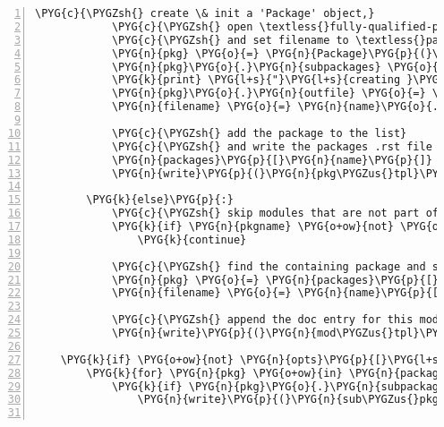 \begin{Verbatim}[commandchars=\\\{\},numbers=left,firstnumber=1,stepnumber=5]
            \PYG{c}{\PYGZsh{} create \& init a 'Package' object,}
            \PYG{c}{\PYGZsh{} open \textless{}fully-qualified-package-name\textgreater{}.rst}
            \PYG{c}{\PYGZsh{} and set filename to \textless{}package-name\textgreater{}/\PYGZus{}\PYGZus{}init\PYGZus{}\PYGZus{}.py}
            \PYG{n}{pkg} \PYG{o}{=} \PYG{n}{Package}\PYG{p}{(}\PYG{p}{)}
            \PYG{n}{pkg}\PYG{o}{.}\PYG{n}{subpackages} \PYG{o}{=} \PYG{p}{[}\PYG{p}{]}
            \PYG{k}{print} \PYG{l+s}{"}\PYG{l+s}{creating }\PYG{l+s+si}{\PYGZpc{}s}\PYG{l+s}{.rst}\PYG{l+s}{"} \PYG{o}{\PYGZpc{}} \PYG{n}{name}
            \PYG{n}{pkg}\PYG{o}{.}\PYG{n}{outfile} \PYG{o}{=} \PYG{n+nb}{open}\PYG{p}{(}\PYG{n}{name} \PYG{o}{+} \PYG{l+s}{'}\PYG{l+s}{.rst}\PYG{l+s}{'}\PYG{p}{,} \PYG{l+s}{'}\PYG{l+s}{w}\PYG{l+s}{'}\PYG{p}{)}
            \PYG{n}{filename} \PYG{o}{=} \PYG{n}{name}\PYG{o}{.}\PYG{n}{split}\PYG{p}{(}\PYG{l+s}{'}\PYG{l+s}{.}\PYG{l+s}{'}\PYG{p}{)}\PYG{p}{[}\PYG{o}{-}\PYG{l+m+mi}{1}\PYG{p}{]} \PYG{o}{+} \PYG{n}{os}\PYG{o}{.}\PYG{n}{sep} \PYG{o}{+} \PYG{l+s}{'}\PYG{l+s}{\PYGZus{}\PYGZus{}init\PYGZus{}\PYGZus{}.py}\PYG{l+s}{'}

            \PYG{c}{\PYGZsh{} add the package to the list}
            \PYG{c}{\PYGZsh{} and write the packages .rst file heading}
            \PYG{n}{packages}\PYG{p}{[}\PYG{n}{name}\PYG{p}{]} \PYG{o}{=} \PYG{n}{pkg}
            \PYG{n}{write}\PYG{p}{(}\PYG{n}{pkg\PYGZus{}tpl}\PYG{p}{)}

        \PYG{k}{else}\PYG{p}{:}
            \PYG{c}{\PYGZsh{} skip modules that are not part of any package, like setup.py}
            \PYG{k}{if} \PYG{n}{pkgname} \PYG{o+ow}{not} \PYG{o+ow}{in} \PYG{n}{packages}\PYG{p}{:}
                \PYG{k}{continue}

            \PYG{c}{\PYGZsh{} find the containing package and set filename to \textless{}module\textgreater{}.py}
            \PYG{n}{pkg} \PYG{o}{=} \PYG{n}{packages}\PYG{p}{[}\PYG{n}{pkgname}\PYG{p}{]}
            \PYG{n}{filename} \PYG{o}{=} \PYG{n}{name}\PYG{p}{[}\PYG{n+nb}{len}\PYG{p}{(}\PYG{n}{pkgname}\PYG{p}{)}\PYG{o}{+}\PYG{l+m+mi}{1}\PYG{p}{:}\PYG{p}{]} \PYG{o}{+} \PYG{l+s}{'}\PYG{l+s}{.py}\PYG{l+s}{'}

            \PYG{c}{\PYGZsh{} append the doc entry for this module to the package .rst file}
            \PYG{n}{write}\PYG{p}{(}\PYG{n}{mod\PYGZus{}tpl}\PYG{p}{)}

    \PYG{k}{if} \PYG{o+ow}{not} \PYG{n}{opts}\PYG{p}{[}\PYG{l+s}{'}\PYG{l+s}{--source}\PYG{l+s}{'}\PYG{p}{]}\PYG{p}{:}
        \PYG{k}{for} \PYG{n}{pkg} \PYG{o+ow}{in} \PYG{n}{packages}\PYG{o}{.}\PYG{n}{values}\PYG{p}{(}\PYG{p}{)}\PYG{p}{:}
            \PYG{k}{if} \PYG{n}{pkg}\PYG{o}{.}\PYG{n}{subpackages}\PYG{p}{:}
                \PYG{n}{write}\PYG{p}{(}\PYG{n}{sub\PYGZus{}pkg\PYGZus{}tpl}\PYG{p}{,} \PYG{n}{names}\PYG{o}{=}\PYG{l+s}{"}\PYG{l+s+se}{\PYGZbs{}n}\PYG{l+s+se}{\PYGZbs{}t}\PYG{l+s}{"}\PYG{o}{.}\PYG{n}{join}\PYG{p}{(}\PYG{n}{pkg}\PYG{o}{.}\PYG{n}{subpackages}\PYG{p}{)}\PYG{p}{)}


\end{Verbatim}
